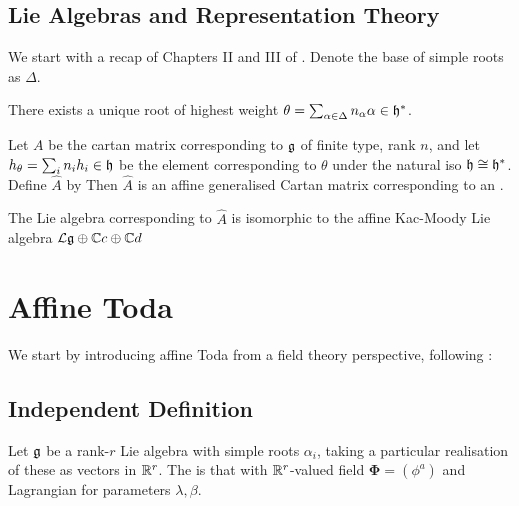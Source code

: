 \documentclass{article}
\begin{document}
\subsection{Lie Algebras and Representation Theory}
We start with a recap of Chapters II and III of \cite{Humphreys1978}. Denote the base of simple roots as $\Delta$. 

\begin{prop}
	There exists a unique root of highest weight $\theta = \sum_{\alpha \in \Delta} n_\alpha \alpha \in \mathfrak{h}^\ast$. 
\end{prop}

\begin{prop}
	Let $A$ be the cartan matrix corresponding to $\mathfrak{g}$ of finite type, rank $n$, and let $h_\theta = \sum_i n_i h_i\in \mathfrak{h}$ be the element corresponding to $\theta$ under the natural iso $\mathfrak{h} \cong \mathfrak{h}^\ast$. Define $\hat{A}$ by 
Then $\hat{A}$ is an affine generalised Cartan matrix corresponding to an .  
\end{prop}

\begin{prop}
	The Lie algebra corresponding to $\hat{A}$ is isomorphic to the affine Kac-Moody Lie algebra $\mathcal{L}\mathfrak{g} \oplus \mathbb{C}c \oplus \mathbb{C}d$
\end{prop}


\section{Affine Toda}
 We start by introducing affine Toda from a field theory perspective, following \cite{Braden1990}:
 
\subsection{Independent Definition}
 
\begin{definition}
	Let $\mathfrak{g}$ be a rank-$r$ Lie algebra with simple roots $\alpha_i$, taking a particular realisation of these as vectors in $\mathbb{R}^r$. The  is that with $\mathbb{R}^r$-valued field $\bm{\Phi} = (\phi^a)$ and Lagrangian 
for parameters $\lambda,\beta$.
\end{definition}
\end{document}
